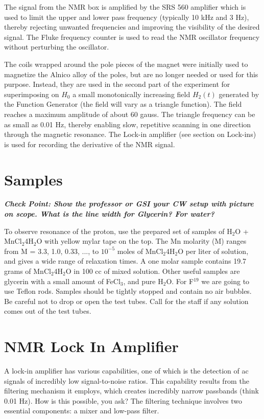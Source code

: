 \documentclass{../lab}
\begin{document}
The signal from the NMR box is amplified by the SRS 560 amplifier which is used to limit the upper and lower pass frequency (typically 10 kHz and 3 Hz), thereby rejecting unwanted frequencies and improving the visibility of the desired signal. The Fluke frequency counter is used to read the NMR oscillator frequency without perturbing the oscillator.

The coils wrapped around the pole pieces of the magnet were initially used to magnetize the Alnico alloy of the poles, but are no longer needed or used for this purpose. Instead, they are used in the second part of the experiment for superimposing on $H_0$ a small monotonically increasing field $H_2(t)$ generated by the Function Generator (the field will vary as a triangle function). The field reaches a maximum amplitude of about 60 gauss. The triangle frequency can be as small as 0.01 Hz, thereby enabling slow, repetitive scanning in one direction through the magnetic resonance. The Lock-in amplifier (see section on Lock-ins) is used for recording the derivative of the NMR signal.

\section{Samples}

\emph{\textbf{Check Point: Show the professor or GSI your CW setup with picture on scope. What is the line width for Glycerin? For water?}}

To observe resonance of the proton, use the prepared set of samples of H$_2$O + MnCl$_2$4H$_2$O with yellow mylar tape on the top. The Mn molarity (M) ranges from M = 3.3, 1.0, 0.33, ..., to $10^{-5}$ moles of MnCl$_2$4H$_2$O per liter of solution, and gives a wide range of relaxation times. A one molar sample contains 19.7 grams of MnCl$_2$4H$_2$O in 100 cc of mixed solution. Other useful samples are glycerin with a small amount of FeCl$_3$, and pure H$_2$O. For F$^{19}$ we are going to use Teflon rods. Samples should be tightly stopped and contain no air bubbles. Be careful not to drop or open the test tubes. Call for the staff if any solution comes out of the test tubes.

\section{NMR Lock In Amplifier}

A lock-in amplifier has various capabilities, one of which is the detection of ac signals of incredibly low signal-to-noise ratios. This capability results from the filtering mechanism it employs, which creates incredibly narrow passbands (think 0.01 Hz). How is this possible, you ask? The filtering technique involves two essential components: a mixer and low-pass filter.
\end{document}
